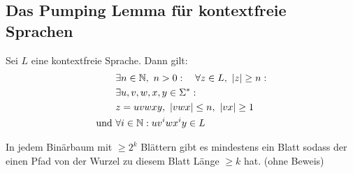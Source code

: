 \subsection{Das Pumping Lemma für kontextfreie Sprachen}
\begin{Satz}
\label{satz:PL für CFL}
	Sei $L$ eine kontextfreie Sprache. Dann gilt:
	        \begin{alignat*}{2}
                &\exists n\in\N,\ n>0:\quad \forall z\in L,\ |z|\geq n:\\
                &\exists u,v,w,x,y\in\Sigma^* :\\
                &z = uvwxy,\ |vwx| \leq n,\ |vx| \geq 1\\
                \text{und }& \forall i\in\N: uv^iwx^iy\in L
        \end{alignat*}
\end{Satz}
\begin{lemma}\label{lemma:Binärbaum}
	In jedem Binärbaum
	mit $\geq 2^k$ Blättern gibt es mindestens ein Blatt sodass der einen Pfad von der Wurzel zu diesem Blatt Länge $\geq k$ hat.
	(ohne Beweis)
\end{lemma}

